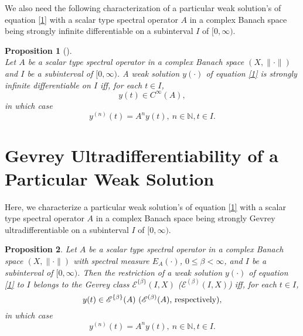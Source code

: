 \documentclass{amsart}
\theoremstyle{plain}
\newtheorem{prop}{Proposition}[section]
\theoremstyle{definition}
\begin{document}
We also need the following characterization of a particular weak solution's of equation \eqref{1} with a scalar type spectral operator $A$ in a complex Banach space being strongly infinite differentiable on a subinterval $I$ of $[0,\infty)$.

\begin{prop}[{\cite[Corollary $3.2$]{Markin2011}}]\label{Cor}\ \\
Let $A$ be a scalar type spectral operator in a complex Banach space $(X,\|\cdot\|)$ and $I$ be a subinterval of $[0,\infty)$.
A weak solution $y(\cdot)$ of equation \eqref{1} is strongly infinite differentiable on $I$ iff, for each $t\in I$, 
\begin{equation*}
y(t) \in C^\infty(A),
\end{equation*}
in which case
\begin{equation*}
y^{(n)}(t)=A^ny(t),\ n\in {{\mathbb N}},t\in I.
\end{equation*}
\end{prop}

\section{Gevrey Ultradifferentiability 
of a Particular Weak Solution}

Here, we characterize a particular weak solution's of equation \eqref{1} with a scalar type spectral operator $A$ in a complex Banach space being strongly Gevrey ultradifferentiable on a subinterval $I$ of $[0,\infty)$.

\begin{prop}\label{particular}
Let $A$ be a scalar type spectral operator in a complex Banach space $(X,\|\cdot\|)$ with spectral measure $E_A(\cdot)$, $0\le \beta<\infty$, and $I$ be a subinterval of $[0,\infty)$. Then the restriction of
a weak solution $y(\cdot)$ of equation \eqref{1} to $I$ belongs to the Gevrey class ${\mathscr E}^{\{\beta\}}(I,X)$
\textup{(${\mathscr E}^{(\beta)}(I,X)$)} iff, for each $t\in I$, 
\begin{equation*}
y(t) \in {\mathscr E}^{\{\beta\}}(A)
\ \textup{(${\mathscr E}^{(\beta)}(A)$, respectively)},
\end{equation*}
in which case
\begin{equation*}
y^{(n)}(t)=A^ny(t),\ n\in {{\mathbb N}},t\in I.
\end{equation*}
\end{prop}
\end{document}
